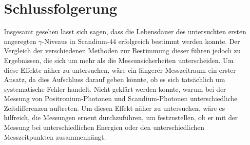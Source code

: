 \documentclass[
	a4paper,
	12pt,
	pagesize,
	ngerman
]{scrartcl}
\begin{document}
	\section{Schlussfolgerung}
	Insgesamt gesehen lässt sich sagen, dass die Lebensdauer des untersuchten ersten angeregten $\gamma$-Niveaus in Scandium-44 erfolgreich bestimmt werden konnte.
	Der Vergleich der verschiedenen Methoden zur Bestimmung dieser führen jedoch zu Ergebnissen, die sich um mehr als die Messunsicherheiten unterscheiden.
	Um diese Effekte näher zu untersuchen, wäre ein längerer Messzeitraum ein erster Ansatz, da dies Aufschluss darauf geben könnte, ob es sich tatsächlich um systematische Fehler handelt.
	Nicht geklärt werden konnte, warum bei der Messung von Positronium-Photonen und Scandium-Photonen unterschiedliche Zeitdifferenzen auftreten.
	Um diesen Effekt näher zu untersuchen, wäre es hilfreich, die Messungen erneut durchzuführen, um festzustellen, ob er mit der Messung bei unterschiedlichen Energien oder den unterschiedlichen Messzeitpunkten zusammenhängt.

	\printbibliography %
\end{document}
